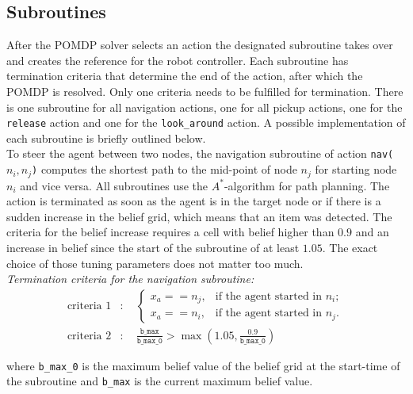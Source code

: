\subsection{Subroutines}\label{subsec:subroutine}
After the POMDP solver selects an action the designated subroutine takes over and creates the reference for the robot controller. Each subroutine has termination criteria that determine the end of the action, after which the POMDP is resolved. Only one criteria needs to be fulfilled for termination. There is one subroutine for all navigation actions, one for all pickup actions, one for the \texttt{release} action and one for the \texttt{look\_around} action. A possible implementation of each subroutine is briefly outlined below.\\

To steer the agent between two nodes, the navigation subroutine of action \texttt{nav($n_i, n_j$)} computes the shortest path to the mid-point of node $n_j$ for starting node $n_i$ and vice versa. All subroutines use the $A^*$-algorithm for path planning. The action is terminated as soon as the agent is in the target node or if there is a sudden increase in the belief grid, which means that an item was detected. The criteria for the belief increase requires a cell with belief higher than $0.9$ and an increase in belief since the start of the subroutine of at least $1.05$. The exact choice of those tuning parameters does not matter too much. \\

\textit{Termination criteria for the navigation subroutine:}
\begin{align}
    \text{criteria 1}&: \quad
    \begin{cases}x_a == n_j, &\text{if the agent started in }n_i;\\ 
    x_a == n_i, & \text{if the agent started in }n_j. \end{cases}\\
    \text{criteria 2}&:\quad \frac{\texttt{b\_max}}{\texttt{b\_max\_0}} > \max\left(1.05, \frac{0.9}{\texttt{b\_max\_0}}\right)\label{eq:subr_crit2}
\end{align}

where \texttt{b\_max\_0} is the maximum belief value of the belief grid at the start-time of the subroutine and \texttt{b\_max} is the current maximum belief value. \\

